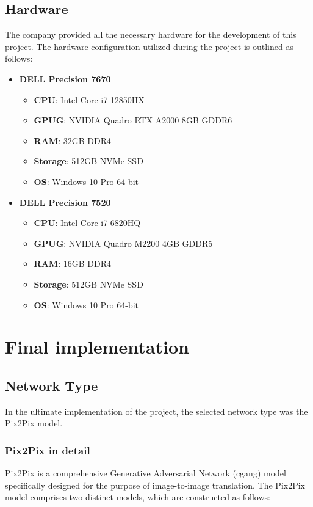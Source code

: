 \subsection{Hardware}\label{subsec:hardware}
The company provided all the necessary hardware for the development of this project. 
The hardware configuration utilized during the project is outlined as follows: \\
\begin{itemize}
    \item \textbf{DELL Precision 7670}
    \begin{itemize}
        \item \textbf{CPU}: Intel Core i7-12850HX
        \item \textbf{\gls{GPUG}}: NVIDIA Quadro RTX A2000 8GB GDDR6
        \item \textbf{RAM}: 32GB DDR4
        \item \textbf{Storage}: 512GB NVMe SSD
        \item \textbf{OS}: Windows 10 Pro 64-bit
    \end{itemize}
    \item \textbf{DELL Precision 7520}
    \begin{itemize}
        \item \textbf{CPU}: Intel Core i7-6820HQ
        \item \textbf{\gls{GPUG}}: NVIDIA Quadro M2200 4GB GDDR5
        \item \textbf{RAM}: 16GB DDR4
        \item \textbf{Storage}: 512GB NVMe SSD
        \item \textbf{OS}: Windows 10 Pro 64-bit
    \end{itemize}
\end{itemize}
\section{Final implementation}\label{sec:final-implementation}
\subsection{Network Type}\label{subsec:network-type}
In the ultimate implementation of the project, the selected network type was the Pix2Pix model.
\subsubsection{Pix2Pix in detail}\label{subsubsec:pix2pix-in-detail}
Pix2Pix is a comprehensive Generative Adversarial Network (\gls{cgang}) model specifically designed for the purpose of image-to-image translation. 
The Pix2Pix model comprises two distinct models, which are constructed as follows:
